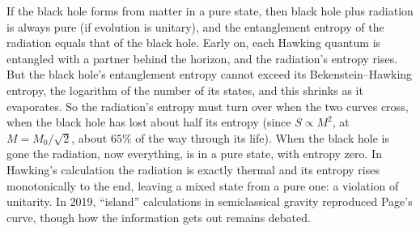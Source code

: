  If the black hole forms from matter in a pure state, then black hole plus radiation is always pure (if evolution is unitary), and the entanglement entropy of the radiation equals that of the black hole. Early on, each Hawking quantum is entangled with a partner behind the horizon, and the radiation's entropy rises. But the black hole's entanglement entropy cannot exceed its Bekenstein--Hawking entropy, the logarithm of the number of its states, and this shrinks as it evaporates. So the radiation's entropy must turn over when the two curves cross, when the black hole has lost about half its entropy (since $S\propto M^2$, at $M = M_0/\sqrt2$, about $65\%$ of the way through its life). When the black hole is gone the radiation, now everything, is in a pure state, with entropy zero. In Hawking's calculation the radiation is exactly thermal and its entropy rises monotonically to the end, leaving a mixed state from a pure one: a violation of unitarity. In 2019, ``island'' calculations in semiclassical gravity reproduced Page's curve, though how the information gets out remains debated.
